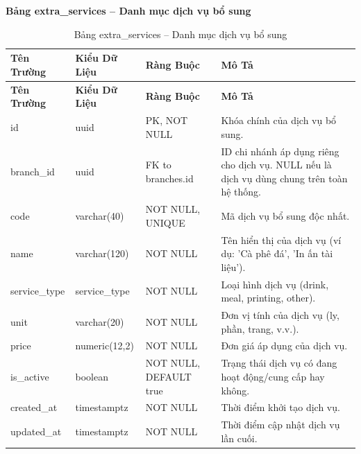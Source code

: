 \textbf{Bảng extra\_services -- Danh mục dịch vụ bổ sung}
\label{table:extra_services}
\begin{longtable}{|p{3cm}|p{2.5cm}|p{3.5cm}|p{5cm}|}
\caption{Bảng extra\_services -- Danh mục dịch vụ bổ sung} \\
\hline
\textbf{Tên Trường} & \textbf{Kiểu Dữ Liệu} & \textbf{Ràng Buộc} & \textbf{Mô Tả} \\
\hline
\endfirsthead
\hline
\textbf{Tên Trường} & \textbf{Kiểu Dữ Liệu} & \textbf{Ràng Buộc} & \textbf{Mô Tả} \\
\hline
\endhead
id & uuid & PK, NOT NULL & Khóa chính của dịch vụ bổ sung. \\
\hline
branch\_id & uuid & FK to branches.id & ID chi nhánh áp dụng riêng cho dịch vụ. NULL nếu là dịch vụ dùng chung trên toàn hệ thống. \\
\hline
code & varchar(40) & NOT NULL, UNIQUE & Mã dịch vụ bổ sung độc nhất. \\
\hline
name & varchar(120) & NOT NULL & Tên hiển thị của dịch vụ (ví dụ: 'Cà phê đá', 'In ấn tài liệu'). \\
\hline
service\_type & service\_type & NOT NULL & Loại hình dịch vụ (drink, meal, printing, other). \\
\hline
unit & varchar(20) & NOT NULL & Đơn vị tính của dịch vụ (ly, phần, trang, v.v.). \\
\hline
price & numeric(12,2) & NOT NULL & Đơn giá áp dụng của dịch vụ. \\
\hline
is\_active & boolean & NOT NULL, DEFAULT true & Trạng thái dịch vụ có đang hoạt động/cung cấp hay không. \\
\hline
created\_at & timestamptz & NOT NULL & Thời điểm khởi tạo dịch vụ. \\
\hline
updated\_at & timestamptz & NOT NULL & Thời điểm cập nhật dịch vụ lần cuối. \\
\hline
\end{longtable}

